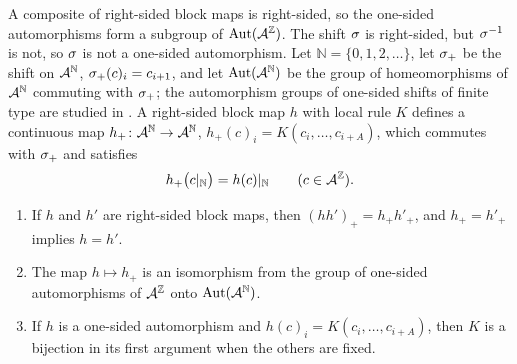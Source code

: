 A composite of right-sided block maps is right-sided, so the one-sided automorphisms form a subgroup of $\operatorname{Aut}(\mathcal{A}^{\mathbb{Z}})$. The shift $\sigma$ is right-sided, but $\sigma^{-1}$ is not, so $\sigma$ is not a one-sided automorphism. Let $\mathbb N=\{0,1,2,\dots\}$, let $\sigma_+$ be the shift on $\mathcal{A}^{\mathbb N}$, $\sigma_+(c)_i=c_{i+1}$, and let $\operatorname{Aut}(\mathcal{A}^{\mathbb N})$ be the group of homeomorphisms of $\mathcal{A}^{\mathbb N}$ commuting with $\sigma_+$; the automorphism groups of one-sided shifts of finite type are studied in \cite{BFK1990}. A right-sided block map $h$ with local rule $K$ defines a continuous map $h_+\colon\mathcal{A}^{\mathbb N}\to\mathcal{A}^{\mathbb N}$, $h_+(c)_i=K(c_i,\dots,c_{i+A})$, which commutes with $\sigma_+$ and satisfies
\begin{equation}\label{hr:eq:restrict}
h_+\bigl(c|_{\mathbb N}\bigr)=h(c)|_{\mathbb N}\qquad(c\in\mathcal{A}^{\mathbb{Z}}).
\end{equation}

\begin{lemma}\label{hr:lem:onesided}
\begin{enumerate}
\item If $h$ and $h'$ are right-sided block maps, then $(hh')_+=h_+h'_+$, and $h_+=h'_+$ implies $h=h'$.
\item The map $h\mapsto h_+$ is an isomorphism from the group of one-sided automorphisms of $\mathcal{A}^{\mathbb{Z}}$ onto $\operatorname{Aut}(\mathcal{A}^{\mathbb N})$.
\item If $h$ is a one-sided automorphism and $h(c)_i=K(c_i,\dots,c_{i+A})$, then $K$ is a bijection in its first argument when the others are fixed.
\end{enumerate}
\end{lemma}

